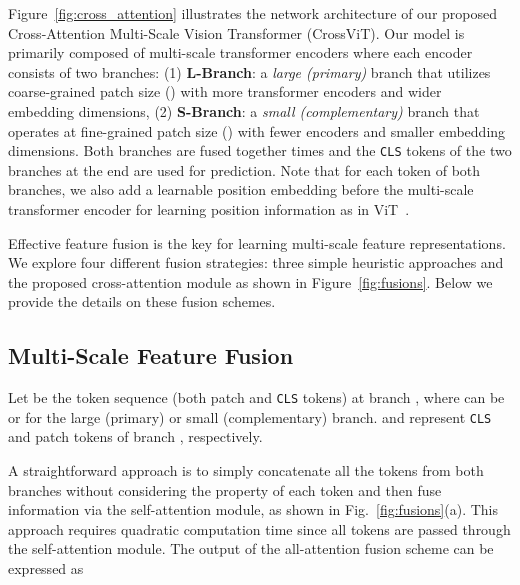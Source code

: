 \documentclass[10pt,twocolumn,letterpaper]{article}
\def\clstoken{\texttt{CLS}\xspace}
\def\ours{CrossViT\xspace}
\newcommand{\myparagraph}[1]{\vspace{1mm} \noindent {\textbf{#1}}}
\begin{document}
Figure~\ref{fig:cross_attention} illustrates the network architecture of our proposed Cross-Attention Multi-Scale Vision Transformer (\ours). Our model is primarily composed of  multi-scale transformer encoders where each encoder consists of two branches: (1) \textbf{L-Branch}: a \textit{large (primary)} branch that utilizes coarse-grained patch size () with more transformer encoders and wider embedding dimensions, (2) \textbf{S-Branch}: a \textit{small (complementary)} branch that operates at fine-grained patch size () with fewer encoders and smaller embedding dimensions. Both branches are fused together  times and the \clstoken tokens of the two branches at the end are used for prediction. 
Note that for each token of both branches, we also add a learnable position embedding before the multi-scale transformer encoder for learning position information as in ViT~\cite{ViT_dosovitskiy2021an}.

Effective feature fusion is the key for learning multi-scale feature representations. We explore four different fusion strategies: three simple heuristic approaches and the proposed cross-attention module as shown in Figure~\ref{fig:fusions}. Below we provide the details on these fusion schemes. 







\subsection{Multi-Scale Feature Fusion}
\label{subsec:ms_fusion}












Let  be the token sequence (both patch and \clstoken tokens) at branch , where  can be  or  for the large (primary) or small (complementary) branch. 
 and  represent \clstoken and patch tokens of branch , respectively. 

\vspace{1mm}
\myparagraph{All-Attention Fusion.}
A straightforward approach is to simply concatenate all the tokens from both branches without considering the property of each token and then fuse information via the self-attention module, as shown in Fig.~\ref{fig:fusions}(a). 
This approach requires quadratic computation time since all tokens are passed through the self-attention module. 
The output  of the all-attention fusion scheme can be expressed as 
\end{document}
